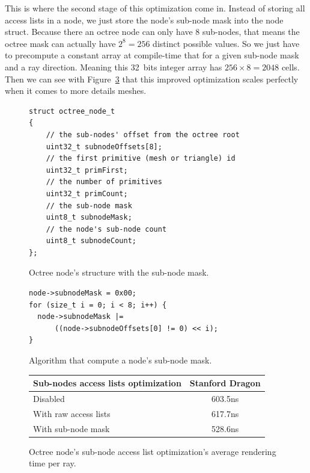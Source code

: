 This is where the second stage of this optimization come in. Instead of storing
all access lists in a node, we just store the node's sub-node mask into the
node struct. Because there an octree node can only have 8 sub-nodes, that
means the octree mask can actually have $2^8 = 256$ distinct possible values.
So we just have to precompute a constant array at compile-time that for a given sub-node mask
and a ray direction. Meaning this 32~bits integer array has $256 \times 8 = 2048$
cells. Then we can see with Figure~\ref{table:subnode_access_list} that this
improved optimization scales perfectly when it comes to more details meshes.

\begin{figure}[H]
    \centering
    \begin{lstlisting}[morekeywords={uint8_t,uint32_t}]
struct octree_node_t
{
    // the sub-nodes' offset from the octree root
    uint32_t subnodeOffsets[8];
    // the first primitive (mesh or triangle) id
    uint32_t primFirst;
    // the number of primitives
    uint32_t primCount;
    // the sub-node mask
    uint8_t subnodeMask;
    // the node's sub-node count
    uint8_t subnodeCount;
};
    \end{lstlisting}
    \caption{Octree node's structure with the sub-node mask.}
    \label{code:mask_access_list}
\end{figure}

\begin{figure}[H]
    \centering
    \begin{lstlisting}[morekeywords={uint8_t,uint32_t}]
node->subnodeMask = 0x00;
for (size_t i = 0; i < 8; i++) {
  node->subnodeMask |=
      ((node->subnodeOffsets[0] != 0) << i);
}
    \end{lstlisting}
    \caption{Algorithm that compute a node's sub-node mask.}
    \label{code:mask_access_list}
\end{figure}

\begin{figure}[H]
    \tiny
    \centering
    \begin{tabular}{ | l | c | }
        \hline
        Sub-nodes access lists optimization & Stanford Dragon \\
        \hline
        Disabled & 603.5ns \\
        With raw access lists & 617.7ns \\
        With sub-node mask & 528.6ns \\
        \hline
    \end{tabular}
    \caption{
        Octree node's sub-node access list optimization's average rendering
        time per ray.
    }
    \label{table:subnode_access_list}
\end{figure}

